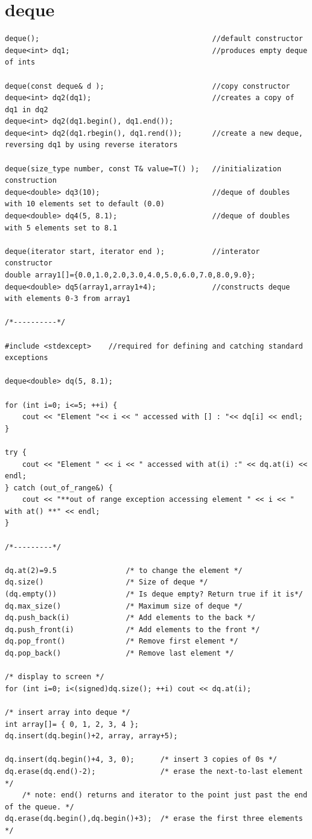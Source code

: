 \documentclass[a4paper]{article}
\begin{document}
	\section{deque}
	\begin{lstlisting}
deque();                   						//default constructor
deque<int> dq1;									//produces empty deque of ints

deque(const deque& d ); 						//copy constructor
deque<int> dq2(dq1);     						//creates a copy of dq1 in dq2
deque<int> dq2(dq1.begin(), dq1.end());
deque<int> dq2(dq1.rbegin(), dq1.rend());		//create a new deque, reversing dq1 by using reverse iterators

deque(size_type number, const T& value=T() );   //initialization construction
deque<double> dq3(10);     						//deque of doubles with 10 elements set to default (0.0)
deque<double> dq4(5, 8.1); 						//deque of doubles with 5 elements set to 8.1

deque(iterator start, iterator end );   		//interator constructor
double array1[]={0.0,1.0,2.0,3.0,4.0,5.0,6.0,7.0,8.0,9.0};
deque<double> dq5(array1,array1+4);      		//constructs deque with elements 0-3 from array1

/*----------*/

#include <stdexcept>	//required for defining and catching standard exceptions

deque<double> dq(5, 8.1);

for (int i=0; i<=5; ++i) {
	cout << "Element "<< i << " accessed with [] : "<< dq[i] << endl;
}

try {
	cout << "Element " << i << " accessed with at(i) :" << dq.at(i) << endl;
} catch (out_of_range&) {
	cout << "**out of range exception accessing element " << i << " with at() **" << endl;
}

/*---------*/

dq.at(2)=9.5				/* to change the element */
dq.size()					/* Size of deque */
(dq.empty())				/* Is deque empty? Return true if it is*/
dq.max_size()				/* Maximum size of deque */
dq.push_back(i)				/* Add elements to the back */
dq.push_front(i)			/* Add elements to the front */
dq.pop_front()				/* Remove first element */
dq.pop_back()				/* Remove last element */

/* display to screen */
for (int i=0; i<(signed)dq.size(); ++i) cout << dq.at(i);

/* insert array into deque */
int array[]= { 0, 1, 2, 3, 4 };
dq.insert(dq.begin()+2, array, array+5);

dq.insert(dq.begin()+4, 3, 0);		/* insert 3 copies of 0s */
dq.erase(dq.end()-2);				/* erase the next-to-last element */
	/* note: end() returns and iterator to the point just past the end of the queue. */
dq.erase(dq.begin(),dq.begin()+3);	/* erase the first three elements */


\end{lstlisting}
\end{document}
